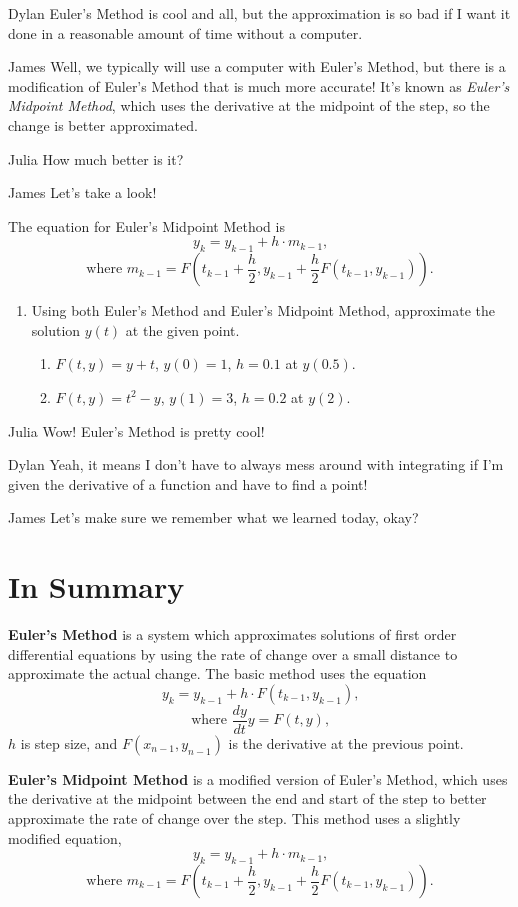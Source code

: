 \documentclass{ximera}
\begin{document}
\begin{dialogue}
\item[Dylan] Euler's Method is cool and all, but the approximation is so bad if I want it done in a reasonable amount of time without a computer.
\item[James] Well, we typically will use a computer with Euler's Method, but there is a modification of Euler's Method that is much more accurate! It's known as \textit{Euler's Midpoint Method}, which uses the derivative at the midpoint of the step, so the change is better approximated.
\item[Julia] How much better is it?
\item[James] Let's take a look!
\end{dialogue}
The equation for Euler's Midpoint Method is $$y_k = y_{k-1}+h \cdot m_{k-1}\text{,}$$ $$\text{where } m_{k-1} = F\left(t_{k-1} + \frac{h}{2}, y_{k-1} + \frac{h}{2}F(t_{k-1},y_{k-1})\right)\text{.}$$ 
\begin{enumerate}
\item Using both Euler's Method and Euler's Midpoint Method, approximate the solution $y(t)$ at the given point.
\begin{enumerate}
\item $F(t, y) = y+t$, $y(0) = 1$, $h = 0.1$ at $y(0.5)$.
\item $F(t, y) = t^2 - y$, $y(1) = 3$, $h=0.2$ at $y(2)$.
\end{enumerate}
\end{enumerate}
\begin{dialogue}
\item[Julia] Wow! Euler's Method is pretty cool!
\item[Dylan] Yeah, it means I don't have to always mess around with integrating if I'm given the derivative of a function and have to find a point!
\item[James] Let's make sure we remember what we learned today, okay?
\end{dialogue}
\section{In Summary}
\begin{definition}
\textbf{Euler's Method} is a system which approximates solutions of first order differential equations by using the rate of change over a small distance to approximate the actual change. The basic method uses the equation $$y_k = y_{k-1} + h \cdot F(t_{k-1}, y_{k-1})\text{,}$$ $$\text{where } \dfrac{dy}{dt} y = F(t,y) \text{,}$$ $h$ is step size, and $F(x_{n-1}, y_{n-1})$ is the derivative at the previous point.
\end{definition}
\begin{definition}
\textbf{Euler's Midpoint Method} is a modified version of Euler's Method, which uses the derivative at the midpoint between the end and start of the step to better approximate the rate of change over the step. This method uses a slightly modified equation, $$y_k = y_{k-1}+h \cdot m_{k-1}\text{,}$$ $$\text{where } m_{k-1} = F\left(t_{k-1} + \frac{h}{2}, y_{k-1} + \frac{h}{2}F(t_{k-1},y_{k-1})\right)\text{.}$$
\end{definition}
\end{document}
